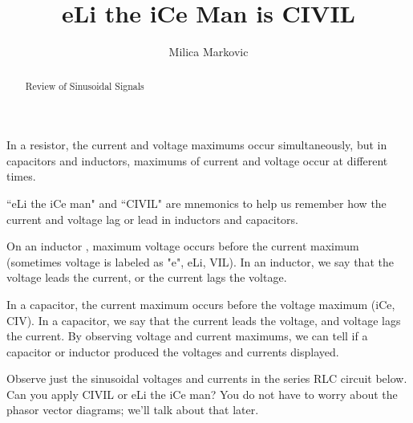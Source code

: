 \documentclass{ximera}
\title{eLi the iCe Man is CIVIL}
\author{Milica Markovic}
\begin{document}
  
\begin{abstract}  
Review of Sinusoidal Signals
\end{abstract}  
\maketitle

In a resistor, the current and voltage maximums occur simultaneously, but in capacitors and inductors, maximums of current and voltage occur at different times.

``eLi the iCe man" and ``CIVIL" are mnemonics to help us remember how the current and voltage lag or lead in inductors and capacitors. 

On an inductor , maximum voltage occurs before the current maximum (sometimes voltage is labeled as "e", eLi, VIL). In an inductor, we say that the voltage leads the current, or the current lags the voltage. 

In a capacitor, the current maximum occurs before the voltage maximum (iCe, CIV). In a capacitor, we say that the current leads the voltage, and voltage lags the current. By observing voltage and current maximums, we can tell if a capacitor or inductor produced the voltages and currents displayed. 

\begin{example}
Observe just the sinusoidal voltages and currents in the series RLC circuit below. Can you apply CIVIL or eLi the iCe man? You do not have to worry about the phasor vector diagrams; we'll talk about that later.

\begin{center}  
\end{center} 
\end{example}
\end{document}
